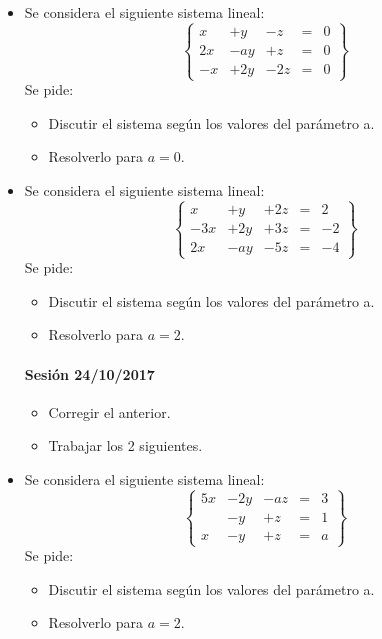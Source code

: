 \begin{itemize}

\item Se considera el siguiente sistema lineal: \[
\left\{\begin{array}{ccccc}
x&+y&-z&=&0\\
2x&-ay&+z&=&0\\
-x&+2y&-2z&=&0
\end{array}\right\}
\]
Se pide:
\begin{itemize}
	\item Discutir el sistema según los valores del parámetro a.
	\item Resolverlo para $a=0$.
\end{itemize}


\item Se considera el siguiente sistema lineal:\[
\left\{\begin{array}{ccccc}
x&+y&+2z&=&2\\
-3x&+2y&+3z&=&-2\\
2x&-ay&-5z&=&-4
\end{array}\right\}
\]
Se pide:
\begin{itemize}
	\item Discutir el sistema según los valores del parámetro a.
	\item Resolverlo para $a=2$.
\end{itemize}


\paragraph{Sesión 24/10/2017}
\begin{itemize}
	\item Corregir el anterior.
	\item Trabajar los 2 siguientes.
\end{itemize}


\item Se considera el siguiente sistema lineal:\[
\left\{\begin{array}{ccccc}
5x&-2y&-az&=&3\\
&-y&+z&=&1\\
x&-y&+z&=&a
\end{array}\right\}
\]
Se pide:
\begin{itemize}
	\item Discutir el sistema según los valores del parámetro a.
	\item Resolverlo para $a=2$.
\end{itemize}


\end{itemize}
